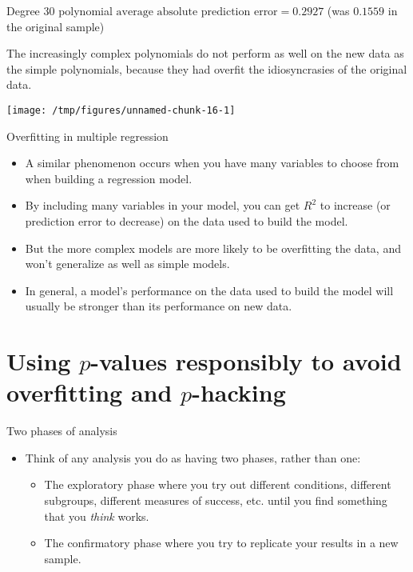 \documentclass{beamer}\usepackage[]{graphicx}\usepackage[]{color}
\makeatletter
\def\maxwidth{ %
  \ifdim\Gin@nat@width>\linewidth
    \linewidth
  \else
    \Gin@nat@width
  \fi
}
\newenvironment{knitrout}{}{} %
\makeatother
\begin{document}
\begin{darkframes}
\begin{frame}{Degree 30 polynomial}
\begin{knitrout}
\end{knitrout}
      \vspace{-1cm} $\text{average absolute prediction error} = 0.2927$
      (was $0.1559$ in the original sample)
    \end{frame}

    \begin{frame}
      The increasingly complex polynomials do not perform as well on the new data as the simple polynomials, because they had \alert{overfit} the idiosyncrasies of the original data.

\begin{knitrout}
\color{fgcolor}
\texttt{[image: /tmp/figures/unnamed-chunk-16-1]} 

\end{knitrout}
    \end{frame}

    \begin{frame}{Overfitting in multiple regression}
      \begin{itemize}[<+->]
        \item A similar phenomenon occurs when you have many variables to choose from when building a regression model.
        \item By including many variables in your model, you can get $R^2$ to increase (or prediction error to decrease) on the data used to build the model.
        \item But the more complex models are more likely to be \alert{overfitting} the data, and won't generalize as well as simple models.
        \item In general, a model's performance on the data used to build the model will usually be stronger than its performance on new data.
      \end{itemize}
    \end{frame}

    \section{Using $p$-values responsibly to avoid overfitting and $p$-hacking}

    \begin{frame}{Two phases of analysis}
      \begin{itemize}
        \item Think of any analysis you do as having two phases, rather than one:
          \begin{itemize}
            \item The \alert{exploratory phase} where you try out different conditions, different subgroups, different measures of success, etc. until you find something that you \emph{think} works.
            \item The \alert{confirmatory phase} where you try to replicate your results in a new sample.
          \end{itemize}
      \end{itemize}
    \end{frame}


\end{darkframes}
\end{document}
